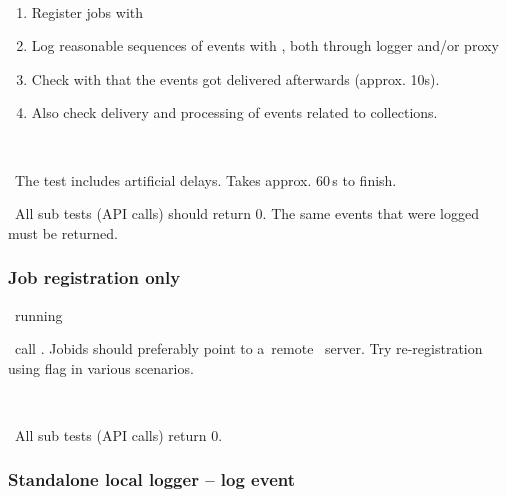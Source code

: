 \what\ 
\begin{enumerate}
\item Register jobs with  
\item Log reasonable sequences of events with , both through logger and/or proxy
\item Check with \code{edg\_wll\_JobLog} that the events got delivered afterwards (approx. 10s).
\item Also check delivery and processing of events related to collections.
\end{enumerate}

\how\ 
%

\note\ The test includes artificial delays. Takes approx. 60\,s to finish.

\result\ All sub tests (API calls) should return 0. The same events that were logged must be returned.


\subsubsection{Job registration only}
\label{reg}
\req\ running 

\what\ call . Jobids should preferably point
to a~remote \LB\ server. Try re-registration using flag  in various scenarios.

\how\ 

\result\ All sub tests (API calls) return 0.




\subsubsection{Standalone local logger -- log event}
\label{log}

